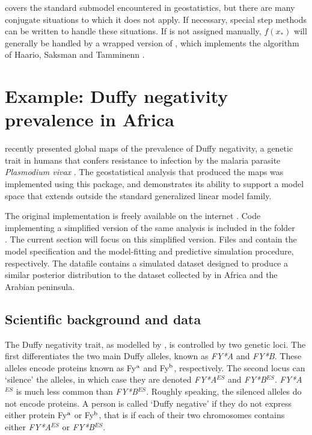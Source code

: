 \documentclass[article]{jss}
\begin{document}
 covers the standard submodel encountered in geostatistics, but there are many conjugate situations to which it does not apply. If necessary, special step methods can be written to handle these situations. If  is not assigned manually, $f(x_*)$ will generally be handled by a wrapped version of  \citep{pymc}, which implements the algorithm of Haario, Saksman and Tamminenn \citep{haario}.


\section{Example: Duffy negativity prevalence in Africa}
\label{sec:duffy} 

\cite{Howes} recently presented global maps of the prevalence of Duffy negativity, a genetic trait in humans that confers resistance to infection by the malaria parasite \emph{Plasmodium vivax} \citep{duffy-vivax}. The geostatistical analysis that produced the maps was implemented using this package, and demonstrates its ability to support a model space that extends outside the standard generalized linear model family. 

The original implementation is freely available on the internet \citep{duffy-code, generic-mbg}. Code implementing a simplified version of the same analysis is included in the folder \\. The current section will focus on this simplified version. Files  and  contain the model specification and the model-fitting and predictive simulation procedure, respectively. The datafile  contains a simulated dataset designed to produce a similar posterior distribution to the dataset collected by \cite{Howes} in Africa and the Arabian peninsula. 

\subsection{Scientific background and data}
\label{subsec:duffy-data} 
The Duffy negativity trait, as modelled by \cite{Howes}, is controlled by two genetic loci. The first differentiates the two main Duffy alleles, known as \emph{FY*A} and \emph{FY*B}. These alleles encode proteins known as Fy$^\textup{a}$ and Fy$^\textup{b}$, respectively. The second locus can `silence' the alleles, in which case they are denoted \emph{FY*A}$^{ES}$ and \emph{FY*B}$^{ES}$. \emph{FY*A}$^{ES}$ is much less common than \emph{FY*B}$^{ES}$. Roughly speaking, the silenced alleles do not encode proteins. A person is called `Duffy negative' if they do not express either protein Fy$^\textup{a}$ or Fy$^\textup{b}$, that is if each of their two chromosomes contains either \emph{FY*A}$^{ES}$ or \emph{FY*B}$^{ES}$. 
\end{document}
